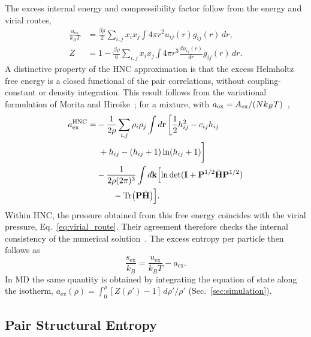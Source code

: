 \documentclass[aps,pre,twocolumn,superscriptaddress,floatfix]{revtex4-2}
\begin{document}
The excess internal energy and compressibility factor follow from the energy and virial routes,
\begin{align}
\frac{u_{\text{ex}}}{k_B T} &= \frac{\beta\rho}{2} \sum_{i,j} x_i x_j \int 4\pi r^2 u_{ij}(r) g_{ij}(r) \, dr,
\label{eq:energy_route}\\
Z &= 1 - \frac{\beta \rho}{6} \sum_{i,j} x_i x_j \int 4\pi r^3 \frac{du_{ij}(r)}{dr} g_{ij}(r) \, dr.
\label{eq:virial_route}
\end{align}
A distinctive property of the HNC approximation is that the excess Helmholtz free energy is a closed functional of the pair correlations, without coupling-constant or density integration. This result follows from the variational formulation of Morita and Hiroike~\cite{Morita1961}; for a mixture, with $a_{\rm ex} = A_{\rm ex} / (N k_B T)$~\cite{Morita1961,Singer1985},
\begin{equation}
\begin{split}
a_{\text{ex}}^{\text{HNC}} = & -\frac{1}{2\rho} \sum_{i,j} \rho_i \rho_j \int d\mathbf{r} \left[ \frac{1}{2} h_{ij}^2 - c_{ij} h_{ij} \right. \\
& \left. \vphantom{\frac{1}{2}} + h_{ij} - (h_{ij} + 1) \ln(h_{ij} + 1) \right] \\
& - \frac{1}{2\rho (2\pi)^3} \int d\mathbf{k} \Bigl[ \ln \det(\mathbf{I} + \mathbf{P}^{1/2} \tilde{\mathbf{H}} \mathbf{P}^{1/2}) \\
& \qquad - \text{Tr}\bigl(\mathbf{P} \tilde{\mathbf{H}}\bigr) \Bigr].
\end{split}
\label{eq:hnc_free_energy}
\end{equation}
Within HNC, the pressure obtained from this free energy coincides with the virial pressure, Eq.~\eqref{eq:virial_route}. Their agreement therefore checks the internal consistency of the numerical solution~\cite{LombaHoye1992}. The excess entropy per particle then follows as
\begin{equation}
\frac{s_{\text{ex}}}{k_B} = \frac{u_{\text{ex}}}{k_B T} - a_{\text{ex}}.
\label{eq:sex_thermo}
\end{equation}
In MD the same quantity is obtained by integrating the equation of state along the isotherm, $a_{\text{ex}}(\rho) = \int_0^\rho [Z(\rho') - 1]\,d\rho'/\rho'$ (Sec.~\ref{sec:simulation}).

\subsection{Pair Structural Entropy}
\end{document}
